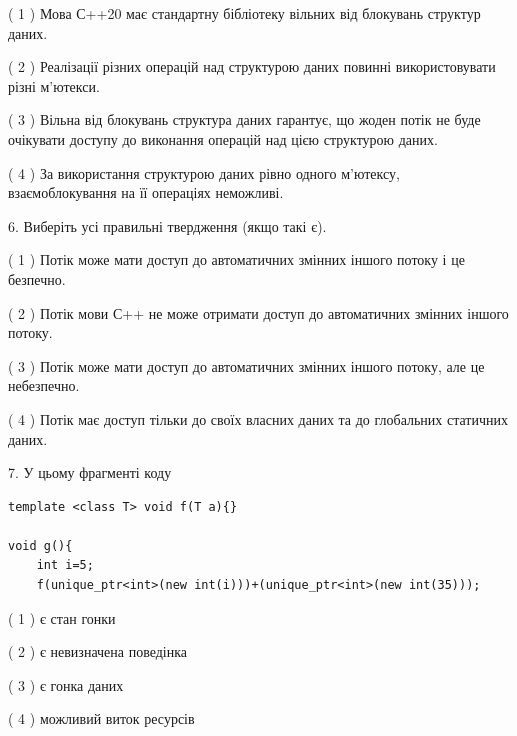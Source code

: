 \documentclass[12pt, ukrainian]{article}
\begin{document}
\begin {large}
{( 1 ) Мова С++20 має стандартну бібліотеку вільних від блокувань структур даних.%

( 2 ) Реалізації різних операцій над структурою даних повинні використовувати різні м’ютекси.%

( 3 ) Вільна від блокувань структура даних гарантує, що жоден потік не буде очікувати доступу до виконання операцій над цією структурою даних.%

( 4 ) За використання структурою даних рівно одного м’ютексу, взаємоблокування на її операціях неможливі.%
\newpage



\vspace{5mm}
6. Виберіть усі правильні твердження (якщо такі є).\par
\vspace{2mm}

( 1 ) Потік може мати доступ до автоматичних змінних іншого потоку і це безпечно.%

( 2 ) Потік мови С++ не може отримати доступ до автоматичних змінних іншого потоку.%

( 3 ) Потік може мати доступ до автоматичних змінних іншого потоку, але це небезпечно.%

( 4 ) Потік має доступ тільки до своїх власних даних та до глобальних статичних даних.%


\vspace{5mm}
7. У цьому фрагменті коду
\begin{verbatim}
template <class T> void f(T a){}

void g(){
    int i=5;
    f(unique_ptr<int>(new int(i)))+(unique_ptr<int>(new int(35)));
\end{verbatim}
( 1 ) є стан гонки%

( 2 ) є невизначена поведінка%

( 3 ) є гонка даних%

( 4 ) можливий виток ресурсів%
}
\end {large}
\end{document}
